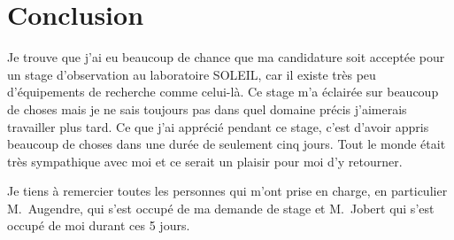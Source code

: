 





			
	\chapter*{Conclusion}
		
       Je trouve que j'ai eu beaucoup de chance que ma candidature soit acceptée pour un stage d'observation au laboratoire SOLEIL, car il existe très peu d'équipements de recherche comme celui-là. Ce stage m'a éclairée sur beaucoup de choses mais je ne sais toujours pas dans quel domaine précis j'aimerais travailler plus tard. Ce que j'ai apprécié pendant ce stage, c'est d'avoir appris beaucoup de choses dans une durée de seulement cinq jours.
       Tout le monde était très sympathique avec moi et ce serait un plaisir pour moi d'y retourner.

       Je tiens à remercier toutes les personnes qui m'ont prise en charge, en particulier M.~Augendre, qui s'est occupé de ma demande de stage et M.~Jobert qui s'est occupé de moi durant ces 5 jours.
